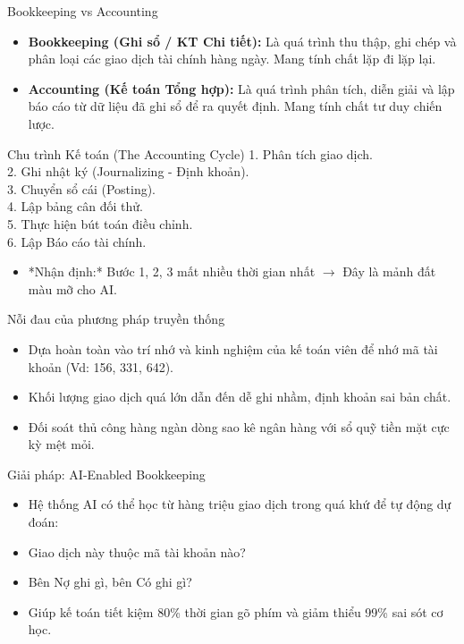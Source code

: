 \documentclass[aspectratio=169]{beamer}
\begin{document}
\begin{frame}{Bookkeeping vs Accounting}
    \begin{itemize}
        \item \textbf{Bookkeeping (Ghi sổ / KT Chi tiết):} Là quá trình thu thập, ghi chép và phân loại các giao dịch tài chính hàng ngày. Mang tính chất lặp đi lặp lại.
        \item \textbf{Accounting (Kế toán Tổng hợp):} Là quá trình phân tích, diễn giải và lập báo cáo từ dữ liệu đã ghi sổ để ra quyết định. Mang tính chất tư duy chiến lược.
    \end{itemize}
\end{frame}


\begin{frame}{Chu trình Kế toán (The Accounting Cycle)}
    1. Phân tích giao dịch.\\
    2. Ghi nhật ký (Journalizing - Định khoản).\\
    3. Chuyển sổ cái (Posting).\\
    4. Lập bảng cân đối thử.\\
    5. Thực hiện bút toán điều chỉnh.\\
    6. Lập Báo cáo tài chính.\\
    \begin{itemize}
        \item *Nhận định:* Bước 1, 2, 3 mất nhiều thời gian nhất $\rightarrow$ Đây là mảnh đất màu mỡ cho AI.
    \end{itemize}
\end{frame}


\begin{frame}{Nỗi đau của phương pháp truyền thống}
    \begin{itemize}
        \item Dựa hoàn toàn vào trí nhớ và kinh nghiệm của kế toán viên để nhớ mã tài khoản (Vd: 156, 331, 642).
        \item Khối lượng giao dịch quá lớn dẫn đến dễ ghi nhầm, định khoản sai bản chất.
        \item Đối soát thủ công hàng ngàn dòng sao kê ngân hàng với sổ quỹ tiền mặt cực kỳ mệt mỏi.
    \end{itemize}
\end{frame}


\begin{frame}{Giải pháp: AI-Enabled Bookkeeping}
    \begin{itemize}
        \item Hệ thống AI có thể học từ hàng triệu giao dịch trong quá khứ để tự động dự đoán:
        \item Giao dịch này thuộc mã tài khoản nào?
        \item Bên Nợ ghi gì, bên Có ghi gì?
        \item Giúp kế toán tiết kiệm 80\% thời gian gõ phím và giảm thiểu 99\% sai sót cơ học.
    \end{itemize}
\end{frame}
\end{document}
